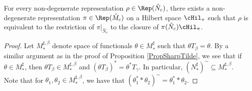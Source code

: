 \begin{thm}\label{ThmCorrespondenceC}
For every non-degenerate representation $\rho \in \Rep(\hat{N}_c)$, there exists a non-degenerate representation $\pi \in \Rep(\hat{M}_c)$ on a Hilbert space $\cHil_\pi$ such that $\rho$ is equivalent to the restriction of $\pi\vert_{\hat{N}_c}$ to the closure of $\pi(\hat{N}_c) \cHil_{\pi}$.
\end{thm}
  \begin{proof}
Let $M_\ast^{\sharp,\beta}$ denote space of functionals $\theta \in M_\ast^\sharp$ such that $\theta T_\beta = \theta$. By a similar argument as in the proof of Proposition \ref{PropSharpTilde}, we see that if $\theta \in M_\ast^\sharp$, then $\theta T_\beta \in M_\ast^{\sharp, \beta}$ and $(\theta T_\beta)^\ast = \theta^\ast T_\gamma$.  In particular, $(N_\ast^\sharp)^\sim \subseteq M_\ast^{\sharp,\beta}$. Note that for $\theta_1, \theta_2 \in  M_\ast^{\sharp, \beta}$, we have that $(\theta_1^\ast \ast \theta_2)^\sim = \theta_1^\ast \ast \theta_2$.



\end{proof}

